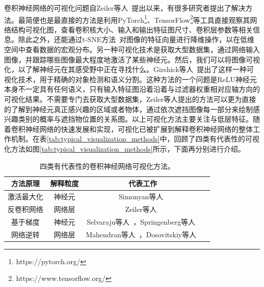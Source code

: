 卷积神经网络的可视化问题自Zeiler等人~\cite{zeiler2014visualizing}提出以来，有很多研究者提出了解决方法。最简便也是最直接的方法是利用PyTorch\footnote{https://pytorch.org/}、TensorFlow\footnote{https://www.tensorflow.org/}等工具直接观察其网络结构可视化图，查看卷积核大小、输入和输出特征图尺寸、卷积层参数等相关信息。除此之外，还能通过t-SNE方法~\cite{maaten2008visualizing}对图像的特征向量进行降维操作，以在低维空间中查看数据的宏观分布。另一种可视化技术是获取大型数据集，通过网络输入图像，并跟踪哪些图像最大程度地激活了某些神经元。然后，我们可以将图像可视化，以了解神经元在其感受野中正在寻找什么。Girshick等人~\cite{girshick2014rich}提出了这样一种可视化技术，用于精确的对象检测和语义分割。这种方法的一个问题是ReLU神经元本身不一定具有任何语义，只有输入特征图沿着沿着与过滤器权重相对应轴方向的可视化结果。不需要专门去获取大型数据集，Zeiler等人提出的方法可以更为直接的了解到神经元真正感兴趣的区域或者物体，通过依次遮挡图像每一部分来绘制感兴趣类别的概率与遮挡物位置的关系图。以上可视化方法主要关注与低层特征。随着卷积神经网络的快速发展和实现，可视化已被扩展到解释卷积神经网络的整体工作机制。在表\ref{tab:typical_visualization_methods}中，回顾了四类有代表性的可视化方法如图\ref{tab:typical_visualization_methods}所示，下面再分别进行介绍。
\begin{table}[h]
	\centering
	\caption{四类有代表性的卷积神经网络可视化方法。}		
	\label{tab:typical_visualization_methods}
	\begin{tabular}{c|c|c|c}
		\toprule[2pt]
		方法原理 & 解释粒度 & 代表工作 \\
		\midrule[2pt]
		激活最大化 & 神经元  & Simonyan等人~\cite{simonyan2013deep}  \\\hline
		反卷积网络 & 网络层  & Zeiler等人~\cite{zeiler2014visualizing, zeiler2010deconvolutional, zeiler2011adaptive} \\\hline
		基于梯度 &  神经元 & Selvaraju等人~\cite{selvaraju2017grad}，Springenberg等人~\cite{springenberg2014striving} \\  \hline
		网络逆转 & 网络层 &Mahendran等人~\cite{mahendran2015understanding, mahendran2016visualizing}，Dosovitskiy等人~\cite{dosovitskiy2016inverting}\\
		\bottomrule[2pt]
	\end{tabular}
	\label{tab:four_visulization_types}
\end{table}
